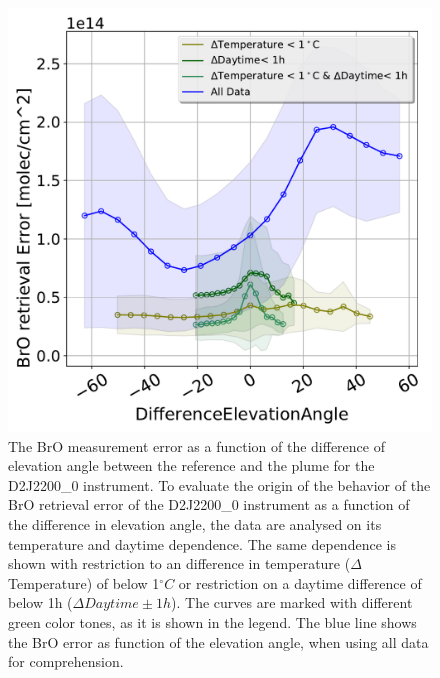 \begin{figure}
	\centering
	\includegraphics[width=0.7\linewidth]{Bilder/DiffElevAngleKomischesInstr}
	\caption{The BrO measurement error as a function of the difference of elevation angle between the reference and the plume for the D2J2200\_0 instrument. To evaluate the origin of the behavior of the BrO retrieval error of the D2J2200\_0 instrument as a function of the difference in elevation angle, the data are analysed on its temperature and daytime dependence. The same dependence is shown with restriction to an difference in temperature ($\Delta$Temperature) of below 1$^{\circ}C$ or restriction on a daytime difference of below 1h ($\Delta Daytime \pm 1h$). The curves are marked with different green color tones, as it is shown in the legend. The blue line shows the BrO error as function of the elevation angle, when using all data for comprehension.}
	\label{fig:d2j22000diffelevangleonetempnevad}
\end{figure}


